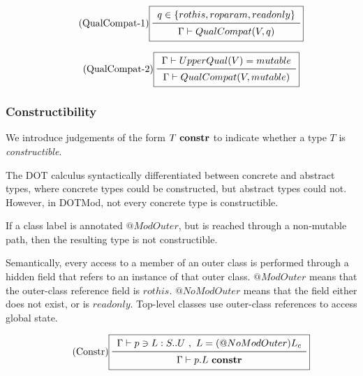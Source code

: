 \begin{equation*}\tag{QualCompat-1}\label{equ-qual-compat-1}
\boxed{
\begin{array}{c}
q \in \{ rothis, roparam, readonly \} \\
\midrule
\Gamma \vdash QualCompat(V,q) \\
\end{array}
}
\end{equation*}

\vspace{0.4cm}

\begin{equation*}\tag{QualCompat-2}\label{equ-qual-compat-2}
\boxed{
\begin{array}{c}
\Gamma \vdash UpperQual(V) = mutable \\
\midrule
\Gamma \vdash QualCompat(V,mutable) \\
\end{array}
}
\end{equation*}

\vspace{0.4cm}




\subsubsection{Constructibility}

We introduce judgements of the form \mbox{$T\ {\bf constr}$}
to indicate whether a type $T$ is {\em constructible}.

The DOT calculus syntactically differentiated between concrete and
abstract types, where concrete types could be constructed,
but abstract types could not.
However, in DOTMod,
not every concrete type is constructible.

If a class label is annotated \mbox{$@ModOuter$},
but is reached through a non-mutable path, then
the resulting type is not constructible.

Semantically, every access to a member of an outer class is performed through
a hidden field that refers to an instance of that outer class.
\mbox{$@ModOuter$} means that the outer-class reference field is $rothis$.
\mbox{$@NoModOuter$} means that the field either does not exist,
or is $readonly$.
Top-level classes use outer-class references to access global state.

\begin{equation*}\tag{Constr}\label{equ-constr}
\boxed{
\begin{array}{c}
\Gamma \vdash p \ni L:S..U\ ,\ L = (@NoModOuter) L_c \\
\midrule
\Gamma \vdash p.L\ {\bf constr} \\
\end{array}
}
\end{equation*}

